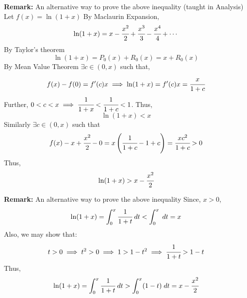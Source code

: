 \documentclass{article}
\begin{document}
\begin{tcolorbox}
\textbf{Remark:} An alternative way to prove the above inequality (taught in Analysis)
Let $f(x) = \ln (1 + x)$
By Maclaurin Expansion, 
$$\ln (1 + x) = x - \cfrac{x^2}{2} + \cfrac{x^3}{3} - \cfrac{x^4}{4} + \cdots$$
By Taylor's theorem
$$\ln (1 + x) = P_0 (x) + R_0 (x) = x + R_0 (x)$$
By Mean Value Theorem $\exists c \in (0, x)$ such that,
$$f(x) - f(0) = f'(c) x \implies \ln (1 + x) = f'(c) x = \cfrac{x}{1 + c}$$
Further, $0 < c < x \implies \cfrac{1}{1 + x} < \cfrac{1}{1 + c} < 1 $. Thus,
$$\ln ( 1 + x ) < x$$
Similarly $\exists c \in (0, x)$ such that 
$$f(x) - x + \cfrac{x^2}{2} - 0 = x \left( \cfrac{1}{1 + c} - 1 + c \right) = \cfrac{xc^2}{1 + c} > 0$$
Thus,
$$\ln (1 + x) > x - \cfrac{x^2}{2}$$
\end{tcolorbox}

\begin{tcolorbox}
\textbf{Remark:} An alternative way to prove the above inequality
Since, $x > 0$,
$$\ln (1 + x) = \int_0^x \cfrac{1}{1 + t} \; dt < \int_0^x \; dt = x$$
Also, we may show that:
$$t > 0 \implies t^2 > 0 \implies 1 > 1 - t^2 \implies \cfrac{1}{1 + t} > 1 - t$$
Thus, 
$$\ln (1 + x) = \int_0^x \cfrac{1}{1 + t} \; dt > \int_0^x (1 - t) \; dt = x - \cfrac{x^2}{2}$$
\end{tcolorbox}



\newpage
\end{document}
